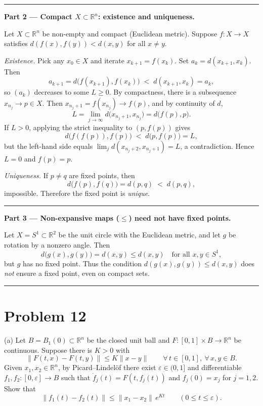\documentclass[12pt,a4paper]{article}
\theoremstyle{plain}
\theoremstyle{definition}
\theoremstyle{remark}
\theoremstyle{remark}
\begin{document}
\bigskip
\hrule
\bigskip

\noindent\textbf{Part 2 — Compact $X\subset\mathbb{R}^n$: existence and uniqueness.}

\medskip
\noindent Let $X\subset\mathbb{R}^n$ be non-empty and compact (Euclidean metric).
Suppose $f:X\to X$ satisfies $d(f(x),f(y))<d(x,y)$ for all $x\ne y$.

\medskip
\noindent\emph{Existence.}
Pick any $x_0\in X$ and iterate $x_{k+1}=f(x_k)$. Set $a_k=d(x_{k+1},x_k)$.
Then
\[
a_{k+1}=d\big(f(x_{k+1}),f(x_k)\big)\;<\;d(x_{k+1},x_k)=a_k,
\]
so $(a_k)$ decreases to some $L\ge0$. By compactness, there is a subsequence
$x_{n_j}\to p\in X$. Then $x_{n_j+1}=f(x_{n_j})\to f(p)$, and by continuity of $d$,
\[
L=\lim_{j\to\infty} d\big(x_{n_j+1},x_{n_j}\big)
= d\big(f(p),p\big).
\]
If $L>0$, applying the strict inequality to $(p,f(p))$ gives
\[
d\big(f(f(p)),f(p)\big)\;<\;d\big(p,f(p)\big)=L,
\]
but the left-hand side equals $\lim_j d(x_{n_j+2},x_{n_j+1})=L$, a contradiction.
Hence $L=0$ and $f(p)=p$.

\medskip
\noindent\emph{Uniqueness.}
If $p\ne q$ are fixed points, then
\[
d\big(f(p),f(q)\big)=d(p,q)\;<\;d(p,q),
\]
impossible. Therefore the fixed point is \emph{unique}.

\bigskip
\hrule
\bigskip

\noindent\textbf{Part 3 — Non-expansive maps ($\le$) need not have fixed points.}

\medskip
\noindent Let $X=S^1\subset\mathbb{R}^2$ be the unit circle with the Euclidean metric,
and let $g$ be rotation by a nonzero angle. Then
\[
d\big(g(x),g(y)\big)=d(x,y)\le d(x,y)\quad\text{for all }x,y\in S^1,
\]
but $g$ has no fixed point. Thus the condition $d(g(x),g(y))\le d(x,y)$
does \emph{not} ensure a fixed point, even on compact sets.

\bigskip
\hrule
\bigskip

\section*{Problem 12}
(a) Let $B=B_1(0)\subset\mathbb{R}^n$ be the closed unit ball and
$F:[0,1]\times B\to\mathbb{R}^n$ be continuous. Suppose there is $K>0$ with
\[
\|F(t,x)-F(t,y)\|\le K\|x-y\|\qquad \forall\,t\in[0,1],\ \forall\,x,y\in B.
\]
Given $x_1,x_2\in\mathbb{R}^n$, by Picard--Lindelöf there exist
$\varepsilon\in(0,1]$ and differentiable $f_1,f_2:[0,\varepsilon]\to B$ such that
$\dot f_j(t)=F(t,f_j(t))$ and $f_j(0)=x_j$ for $j=1,2$. Show that
\[
\|f_1(t)-f_2(t)\|\le \|x_1-x_2\|\,e^{Kt}\qquad (0\le t\le\varepsilon).
\]
\end{document}
